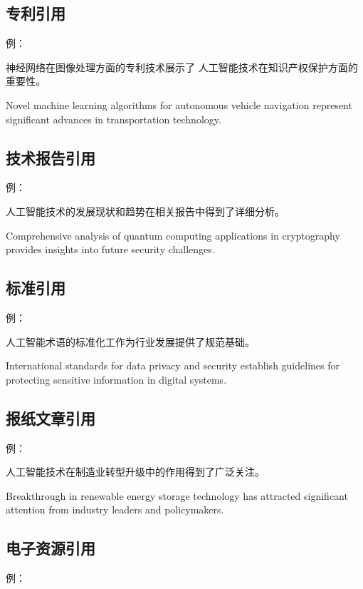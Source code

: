 \subsection{专利引用}


例：

神经网络在图像处理方面的专利技术\cite{patent2021cn}展示了
人工智能技术在知识产权保护方面的重要性。

Novel machine learning algorithms for autonomous vehicle navigation\cite{patent2021us} represent significant advances in transportation technology.

\subsection{技术报告引用}


例：

人工智能技术的发展现状和趋势在相关报告中得到了详细分析\cite{report2021}。

Comprehensive analysis of quantum computing applications in cryptography\cite{report2021quantum} provides insights into future security challenges.

\subsection{标准引用}


例：

人工智能术语的标准化工作\cite{standard2020}为行业发展提供了规范基础。

International standards for data privacy and security\cite{iso2021privacy} establish guidelines for protecting sensitive information in digital systems.

\subsection{报纸文章引用}


例：

人工智能技术在制造业转型升级中的作用\cite{newspaper2021}得到了广泛关注。

Breakthrough in renewable energy storage technology\cite{newspaper2021energy} has attracted significant attention from industry leaders and policymakers.


\subsection{电子资源引用}

例：

